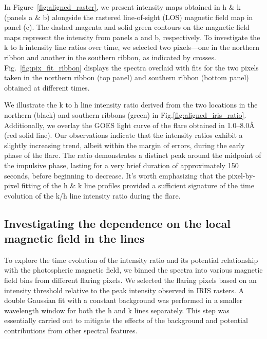 In Figure~\ref{fig:aligned_raster}, we present intensity maps obtained in   h \& k (panels a \& b) alongside the rastered line-of-sight (LOS) magnetic field map in panel (c). The dashed magenta and solid green contours on the magnetic field maps represent the intensity from panels a and b, respectively. To investigate the   k to h intensity line ratios over time, we selected two pixels—one in the northern ribbon and another in the southern ribbon, as indicated by crosses. Fig.~\ref{fig:pix_fit_ribbon} displays the spectra overlaid with fits for the two pixels taken in the northern ribbon (top panel) and southern ribbon (bottom panel) obtained at different times.

We illustrate the   k to h line intensity ratio derived from the two locations in the northern (black) and southern ribbons (green) in Fig.\ref{fig:aligned_iris_ratio}. Additionally, we overlay the GOES light curve of the flare obtained in 1.0{--}8.0{\AA} (red solid line). Our observations indicate that the intensity ratios exhibit a slightly increasing trend, albeit within the margin of errors, during the early phase of the flare. The ratio demonstrates a distinct peak around the midpoint of the impulsive phase, lasting for a very brief duration of approximately 150 seconds, before beginning to decrease. It's worth emphasizing that the pixel-by-pixel fitting of the   h \& k line profiles provided a sufficient signature of the time evolution of the k/h line intensity ratio during the flare.

\subsection{Investigating the dependence on the local magnetic field in the   lines}

To explore the time evolution of the intensity ratio and its potential relationship with the photospheric magnetic field, we binned the spectra into various magnetic field bins from different flaring pixels. We selected the flaring pixels based on an intensity threshold relative to the peak intensity observed in IRIS rasters. A double Gaussian fit with a constant background was performed in a smaller wavelength window for both the   h and k lines separately. This step was essentially carried out to mitigate the effects of the background and potential contributions from other spectral features.

